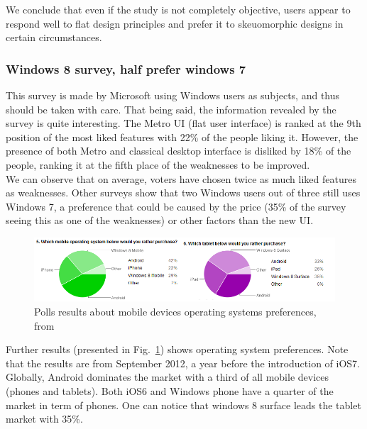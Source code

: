 \documentclass[a4paper,11pt] {article}
\theoremstyle{definition}
\begin{document}
    We conclude that even if the study is not completely objective, users appear to respond well to flat design principles and prefer it to skeuomorphic designs in certain circumstances.

    \subsubsection{Windows 8 survey, half prefer windows 7}

    This survey\cite{windows8Survey} is made by Microsoft using Windows users as subjects, and thus should be taken with care. That being said, the information revealed by the survey is quite interesting. The Metro UI (flat user interface) is ranked at the 9th position of the most liked features with 22\% of the people liking it. However, the presence of both Metro and classical desktop interface is disliked by 18\% of the people, ranking it at the fifth place of the weaknesses to be improved.\\

    We can observe that on average, voters have chosen twice as much liked features as weaknesses. Other surveys show that two Windows users out of three still uses Windows 7, a preference that could be caused by the price (35\% of the survey seeing this as one of the weaknesses) or other factors than the new UI.\\

    \begin{figure}[!h]
     \centering
     \includegraphics[scale=0.55]{fig-report/tablet.png}
     \caption{Polls results about mobile devices operating systems preferences, from \cite{windows8Survey}}
     \label{fig:windowsSurvey}
     \end{figure}

    Further results (presented in Fig.~\ref{fig:windowsSurvey}) shows operating system preferences. Note that the results are from September 2012, a year before the introduction of iOS7. Globally, Android dominates the market with a third of all mobile devices (phones and tablets). Both iOS6 and Windows phone have a quarter of the market in term of phones. One can notice that windows 8 surface leads the tablet market with 35\%.\\
\end{document}
